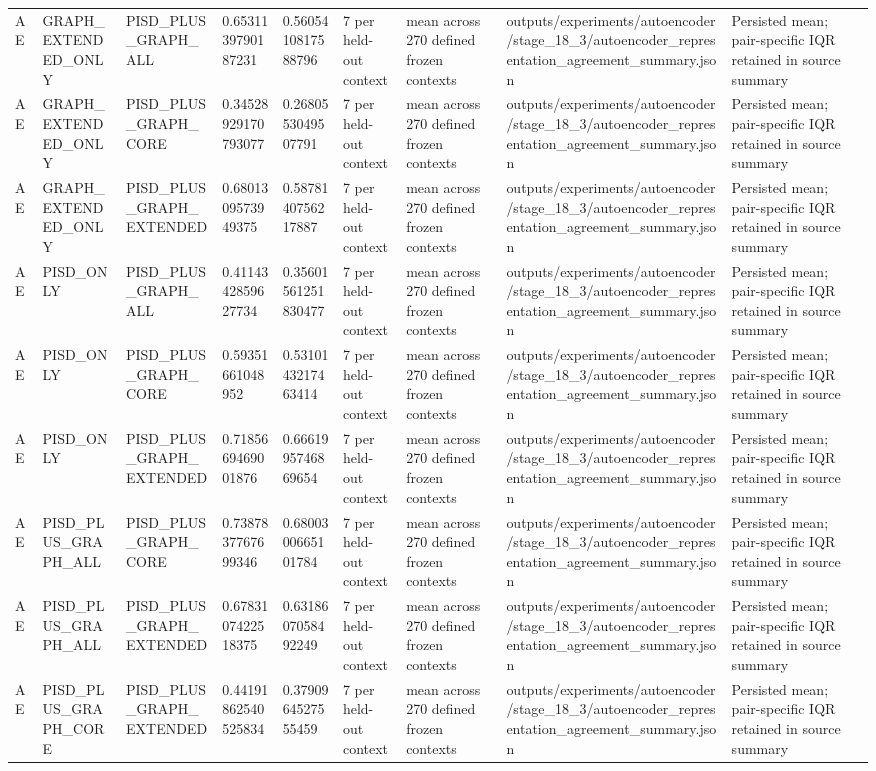 \begin{longtable}{lllllllll}
AE & GRAPH\_EXTENDED\_ONLY & PISD\_PLUS\_GRAPH\_ALL & 0.6531139790187231 & 0.5605410817588796 & 7 per held-out context & mean across 270 defined frozen contexts & outputs/experiments/autoencoder/stage\_18\_3/autoencoder\_representation\_agreement\_summary.json & Persisted mean; pair-specific IQR retained in source summary \\
AE & GRAPH\_EXTENDED\_ONLY & PISD\_PLUS\_GRAPH\_CORE & 0.34528929170793077 & 0.2680553049507791 & 7 per held-out context & mean across 270 defined frozen contexts & outputs/experiments/autoencoder/stage\_18\_3/autoencoder\_representation\_agreement\_summary.json & Persisted mean; pair-specific IQR retained in source summary \\
AE & GRAPH\_EXTENDED\_ONLY & PISD\_PLUS\_GRAPH\_EXTENDED & 0.6801309573949375 & 0.5878140756217887 & 7 per held-out context & mean across 270 defined frozen contexts & outputs/experiments/autoencoder/stage\_18\_3/autoencoder\_representation\_agreement\_summary.json & Persisted mean; pair-specific IQR retained in source summary \\
AE & PISD\_ONLY & PISD\_PLUS\_GRAPH\_ALL & 0.4114342859627734 & 0.35601561251830477 & 7 per held-out context & mean across 270 defined frozen contexts & outputs/experiments/autoencoder/stage\_18\_3/autoencoder\_representation\_agreement\_summary.json & Persisted mean; pair-specific IQR retained in source summary \\
AE & PISD\_ONLY & PISD\_PLUS\_GRAPH\_CORE & 0.59351661048952 & 0.5310143217463414 & 7 per held-out context & mean across 270 defined frozen contexts & outputs/experiments/autoencoder/stage\_18\_3/autoencoder\_representation\_agreement\_summary.json & Persisted mean; pair-specific IQR retained in source summary \\
AE & PISD\_ONLY & PISD\_PLUS\_GRAPH\_EXTENDED & 0.7185669469001876 & 0.6661995746869654 & 7 per held-out context & mean across 270 defined frozen contexts & outputs/experiments/autoencoder/stage\_18\_3/autoencoder\_representation\_agreement\_summary.json & Persisted mean; pair-specific IQR retained in source summary \\
AE & PISD\_PLUS\_GRAPH\_ALL & PISD\_PLUS\_GRAPH\_CORE & 0.7387837767699346 & 0.6800300665101784 & 7 per held-out context & mean across 270 defined frozen contexts & outputs/experiments/autoencoder/stage\_18\_3/autoencoder\_representation\_agreement\_summary.json & Persisted mean; pair-specific IQR retained in source summary \\
AE & PISD\_PLUS\_GRAPH\_ALL & PISD\_PLUS\_GRAPH\_EXTENDED & 0.6783107422518375 & 0.6318607058492249 & 7 per held-out context & mean across 270 defined frozen contexts & outputs/experiments/autoencoder/stage\_18\_3/autoencoder\_representation\_agreement\_summary.json & Persisted mean; pair-specific IQR retained in source summary \\
AE & PISD\_PLUS\_GRAPH\_CORE & PISD\_PLUS\_GRAPH\_EXTENDED & 0.44191862540525834 & 0.3790964527555459 & 7 per held-out context & mean across 270 defined frozen contexts & outputs/experiments/autoencoder/stage\_18\_3/autoencoder\_representation\_agreement\_summary.json & Persisted mean; pair-specific IQR retained in source summary \\
\bottomrule
\end{longtable}
